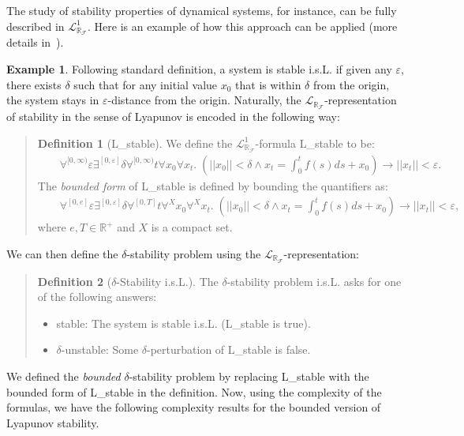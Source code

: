 \documentclass[10pt]{article}
\newcommand{\lrf}{\mathcal{L}_{\mathbb{R}_{\mathcal{F}}}}
\theoremstyle{definition}
\newtheorem{definition}{Definition}[section]
\newtheorem{example}{Example}[section]
\begin{document}
The study of stability properties of dynamical systems, for instance, can be fully described in $\lrf^1$. Here is an example of how this approach can be applied (more details in~\cite{DBLP:journals/corr/GaoKC14}). 
\begin{example}
Following standard definition, a system is stable i.s.L. if given any $\varepsilon$, there exists $\delta$ such that for any initial value $x_0$ that is within $\delta$ from the origin, the system stays in $\varepsilon$-distance from the origin. Naturally, the $\lrf$-representation of stability in the sense of Lyapunov is encoded in the following way:
\begin{quote}
\vspace{-.5cm}
\begin{definition}[{\sf L\_stable}]
We define the $\lrf^1$-formula {\sf L\_stable} to be:
\begin{eqnarray*}
& &\forall^{[0,\infty)} \varepsilon\exists^{[0,\varepsilon]} \delta \forall^{[0,\infty)} t\forall x_0\forall x_t .\; (||x_0||<\delta \wedge x_t = \int_0^t f(s)ds + x_0 )\rightarrow ||x_t||<\varepsilon.
\end{eqnarray*}
The {\em bounded form} of {\sf L\_stable} is defined by bounding the quantifiers as:\begin{eqnarray*}
& &\forall^{[0, e]} \varepsilon\exists^{[0,\varepsilon]} \delta \forall^{[0,T]} t\forall^X x_0\forall^X x_t. \;(||x_0||<\delta \wedge x_t = \int_0^t f(s)ds + x_0 )\rightarrow ||x_t||<\varepsilon, 
\end{eqnarray*}
where $e, T\in \mathbb{R}^+$ and $X$ is a compact set.
\end{definition}
\end{quote}
We can then define the $\delta$-stability problem using the $\lrf$-representation:  
\begin{quote}
\vspace{-.5cm}
\begin{definition}[$\delta$-Stability i.s.L.]\label{sl}
The $\delta$-stability problem i.s.L. asks for one of the following answers:
\begin{itemize}
\item {\sf stable}: The system is stable i.s.L. ({\sf L\_stable} is true). 
\item {\sf $\delta$-unstable}: Some $\delta$-perturbation of {\sf L\_stable} is false. 
\end{itemize}
\end{definition}
\end{quote}
We defined the {\em bounded} $\delta$-stability problem by replacing {\sf L\_stable} with the bounded form of {\sf L\_stable} in the definition. Now, using the complexity of the formulas, we have the following complexity results for the bounded version of Lyapunov stability. 

\end{example}
\end{document}
